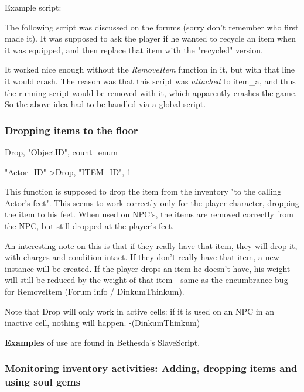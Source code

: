 \documentclass[
]{article}
\begin{document}
Example script:

The following script was discussed on the forums (sorry don't remember
who first made it). It was supposed to ask the player if he wanted to
recycle an item when it was equipped, and then replace that item with
the "recycled" version.



It worked nice enough without the \emph{RemoveItem} function in it, but
with that line it would crash. The reason was that this script was
\emph{attached} to item\_a, and thus the running script would be removed
with it, which apparently crashes the game. So the above idea had to be
handled via a global script.

\hypertarget{dropping-items-to-the-floor}{%
\subsubsection{Dropping items to the
floor}\label{dropping-items-to-the-floor}}

Drop, "ObjectID", count\_enum

"Actor\_ID"-\textgreater Drop, "ITEM\_ID", 1

This function is supposed to drop the item from the inventory "to the
calling Actor's feet". This seems to work correctly only for the player
character, dropping the item to his feet. When used on NPC's, the items
are removed correctly from the NPC, but still dropped at the player's
feet.

An interesting note on this is that if they really have that item, they
will drop it, with charges and condition intact. If they don't really
have that item, a new instance will be created. If the player drops an
item he doesn't have, his weight will still be reduced by the weight of
that item - same as the encumbrance bug for RemoveItem (Forum info /
DinkumThinkum).

Note that Drop will only work in active cells: if it is used on an NPC
in an inactive cell, nothing will happen. -(DinkumThinkum)

\textbf{Examples} of use are found in Bethesda's SlaveScript.

\hypertarget{monitoring-inventory-activities-adding-dropping-items-and-using-soul-gems}{%
\subsubsection{Monitoring inventory activities: Adding, dropping items
and using soul
gems}\label{monitoring-inventory-activities-adding-dropping-items-and-using-soul-gems}}
\end{document}
